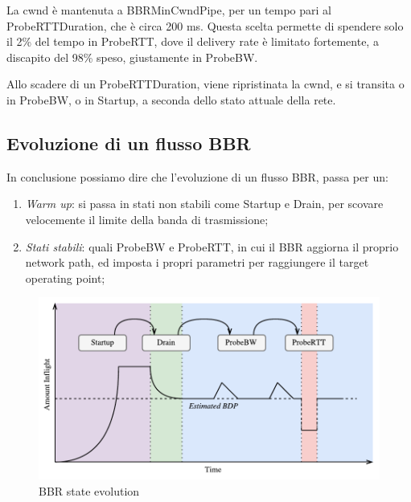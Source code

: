 La cwnd è mantenuta a BBRMinCwndPipe, per un tempo pari al ProbeRTTDuration, che è circa 200 ms. Questa scelta permette di spendere solo il 2\% del tempo in ProbeRTT, dove il delivery rate è limitato fortemente, a discapito del 98\% speso, giustamente in ProbeBW. \bigskip

Allo scadere di un ProbeRTTDuration, viene ripristinata la cwnd, e si transita o in ProbeBW, o in Startup, a seconda dello stato attuale della rete.

\subsection{Evoluzione di un flusso BBR}

In conclusione possiamo dire che l'evoluzione di un flusso BBR, passa per un:

\begin{enumerate}

\item \textit{Warm up}: si passa in stati non stabili come Startup e Drain, per scovare velocemente il limite della banda di trasmissione;

\item \textit{Stati stabili}: quali ProbeBW e ProbeRTT, in cui il BBR aggiorna il proprio network path, ed imposta i propri parametri per raggiungere il target operating point;

\end{enumerate}

\begin{figure}[H]

\center
\caption{BBR state evolution}
\includegraphics[scale=0.8]{chapters/bbr/img/bbr_evolution}

\end{figure}   
